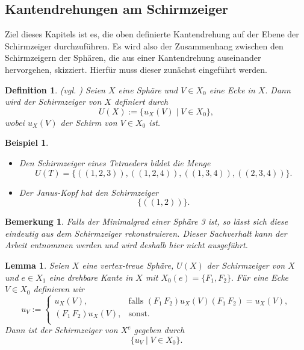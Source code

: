 \documentclass[12pt,titlepage,twoside,cleardoublepage]{article}
\theoremstyle{nummermitklammern}
\newtheorem{lemma}[temp]{Lemma}
\newtheorem{bsp}[temp]{Beispiel}
\newtheorem{definition}[temp]{Definition}
\newtheorem{bemerkung}[temp]{Bemerkung}
\newtheorem{definition}[zahl]{Definition}
\newtheorem{lemma}[zahl]{Lemma}
\newtheorem{bsp}[zahl]{Beispiel}
\newtheorem{bemerkung}[zahl]{Bemerkung}
\numberwithin{equation}{section}
\begin{document}
\subsection{Kantendrehungen am Schirmzeiger}
Ziel dieses Kapitels ist es, die oben definierte Kantendrehung auf der Ebene der Schirmzeiger durchzuführen. Es wird also der Zusammenhang zwischen den Schirmzeigern der Sphären, die aus einer Kantendrehung auseinander hervorgehen, skizziert. Hierfür muss dieser zunächst eingeführt werden.

\begin{definition}{(vgl. \textsc{\cite{simp})}}
Seien $X$ eine Sphäre und $V\in X_0$ eine Ecke in $X.$ Dann wird der \emph{Schirmzeiger} von $X$ definiert durch 
\[
U(X):=\{u_X(V) \mid V\in X_0\},
\]
wobei $u_X(V)$ der Schirm von $V\in X_0$ ist.
\end{definition}
\begin{bsp}
\begin{itemize}
\item 
Den Schirmzeiger eines Tetraeders bildet die Menge 
\[
U(T)=\{ ((1,2,3)),((1,2,4)),((1,3,4)),((2,3,4))\}.
\]
\item Der Janus-Kopf hat den Schirmzeiger 
\[
\{((1,2))\}.
\]
\end{itemize}
\end{bsp}
\begin{bemerkung}
Falls der Minimalgrad einer Sphäre 3 ist, so lässt sich diese eindeutig aus dem Schirmzeiger rekonstruieren. Dieser Sachverhalt kann der Arbeit {\textsc{\cite{simp}}} entnommen werden und wird deshalb hier nicht ausgeführt.
\end{bemerkung}
\begin{lemma}
Seien $X$ eine vertex-treue Sphäre, $U(X)$ der Schirmzeiger von $X$ und $e\in X_1$ eine drehbare Kante in $X$ mit $X_0(e)=\{F_1,F_2\}.$ Für eine Ecke $V\in X_0$ definieren wir  
\[
u_V:=
\begin{cases}
u_X(V),&\text{falls }(F_1\,F_2)u_X(V)(F_1\,F_2)=u_X(V), \\
(F_1\,F_2) u_X(V) ,& \text{sonst.} \\

\end{cases}
\]
Dann ist der Schirmzeiger von $X^e$ gegeben durch 
\[
\{ u_V\mid V \in X_0\}.
\]
\end{lemma}
\end{document}
